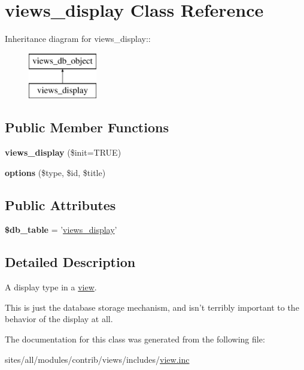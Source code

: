 \hypertarget{classviews__display}{
\section{views\_\-display Class Reference}
\label{classviews__display}
}
Inheritance diagram for views\_\-display::\begin{figure}[H]
\begin{center}
\leavevmode
\includegraphics[height=2cm]{classviews__display}
\end{center}
\end{figure}
\subsection*{Public Member Functions}
\begin{CompactItemize}
\item 
\hypertarget{classviews__display_efb868abc8f5c4ede3d36cd2fdd21897}{
\textbf{views\_\-display} (\$init=TRUE)}
\label{classviews__display_efb868abc8f5c4ede3d36cd2fdd21897}

\item 
\hypertarget{classviews__display_d88e919be5676818ccc899abfaaf370f}{
\textbf{options} (\$type, \$id, \$title)}
\label{classviews__display_d88e919be5676818ccc899abfaaf370f}

\end{CompactItemize}
\subsection*{Public Attributes}
\begin{CompactItemize}
\item 
\hypertarget{classviews__display_e68e1e741bf5c0b633fa15b6721819f4}{
\textbf{\$db\_\-table} = '\hyperlink{classviews__display}{views\_\-display}'}
\label{classviews__display_e68e1e741bf5c0b633fa15b6721819f4}

\end{CompactItemize}


\subsection{Detailed Description}
A display type in a \hyperlink{classview}{view}.

This is just the database storage mechanism, and isn't terribly important to the behavior of the display at all. 

The documentation for this class was generated from the following file:\begin{CompactItemize}
\item 
sites/all/modules/contrib/views/includes/\hyperlink{view_8inc}{view.inc}\end{CompactItemize}
